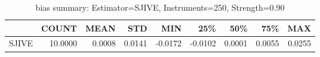 \begin{table}[ht]
\centering
\caption{bias summary: Estimator=SJIVE, Instruments=250, Strength=0.90}
\begin{tabular}{lrrrrrrrr}
\toprule
 & COUNT & MEAN & STD & MIN & 25\% & 50\% & 75\% & MAX \\
\midrule
SJIVE & 10.0000 & 0.0008 & 0.0141 & -0.0172 & -0.0102 & 0.0001 & 0.0055 & 0.0255 \\
\bottomrule
\end{tabular}
\end{table}

